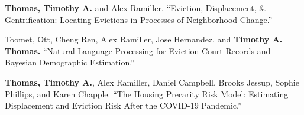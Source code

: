 







\begin{cvparagraph}

\textbf{Thomas, Timothy A.} and Alex Ramiller. “Eviction, Displacement, \& Gentrification: Locating Evictions in Processes of Neighborhood Change.”
\end{cvparagraph}

\begin{cvparagraph}

Toomet, Ott, Cheng Ren, Alex Ramiller, Jose Hernandez, and \textbf{Timothy A. Thomas.} “Natural Language Processing for Eviction Court Records and Bayesian Demographic Estimation.”
\end{cvparagraph}

\begin{cvparagraph}


\textbf{Thomas, Timothy A.}, Alex Ramiller, Daniel Campbell, Brooks Jessup, Sophie Phillips, and Karen Chapple. “The Housing Precarity Risk Model: Estimating Displacement and Eviction Risk After the COVID-19 Pandemic.”

\end{cvparagraph}

